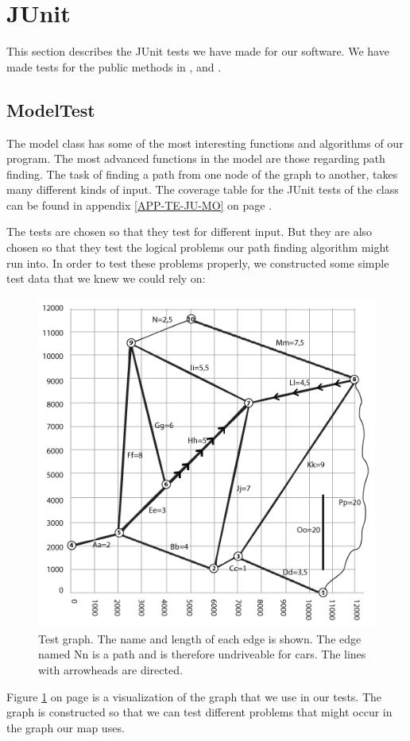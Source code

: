 \section{JUnit}
\label{TEST-JU}
This section describes the JUnit tests we have made for our software. We have
made tests for the public methods in ,  and
.

\subsection{ModelTest}
\label{TEST-JU-MT}
The model class has some of the most interesting functions and algorithms of
our program. The most advanced functions in the model are those regarding path
finding. The task of finding a path from one node of the graph to another,
takes many different kinds of input. The coverage table for the JUnit tests of
the  class can be found in appendix \ref{APP-TE-JU-MO} on page
\pageref{APP-TE-JU-MO}.

The tests are chosen so that they test for different input. But they are also
chosen so that they test the logical problems our path finding algorithm might
run into. In order to test these problems properly, we constructed some simple
test data that we knew we could rely on:

\begin{figure}[!ht]
\centering
\includegraphics[width=0.6\linewidth]{images/TestGraph}
\caption{Test graph. The name and length of each edge is shown. The edge named
Nn is a path and is therefore undriveable for cars. The lines with arrowheads
are directed.}
\label{TEST-JU-MT-TG}
\end{figure}

Figure \ref{TEST-JU-MT-TG} on page \pageref{TEST-JU-MT-TG} is a visualization
of the graph that we use in our tests. The graph is constructed so that we can
test different problems that might occur in the graph our map uses.

